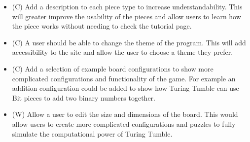 \documentclass{l4proj}
\begin{document}
\begin{itemize}
    \item (C) Add a description to each piece type to increase understandability. This will greater improve the usability of the pieces and allow users to learn how the piece works without needing to check the tutorial page.
    \item (C) A user should be able to change the theme of the program. This will add accessibility to the site and allow the user to choose a theme they prefer.
    \item (C) Add a selection of example board configurations to show more complicated configurations and functionality of the game. For example an addition configuration could be added to show how Turing Tumble can use Bit pieces to add two binary numbers together.
    \item (W) Allow a user to edit the size and dimensions of the board. This would allow users to create more complicated configurations and puzzles to fully simulate the computational power of Turing Tumble.
\end{itemize}
\end{document}

